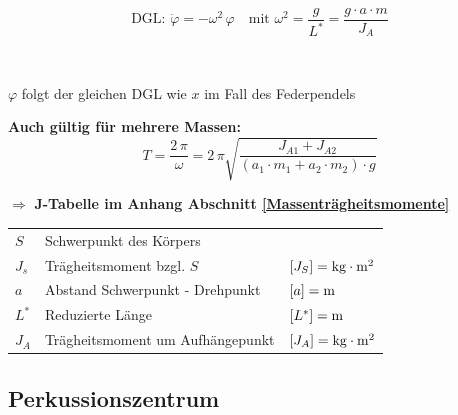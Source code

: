 \begin{minipage}{0.66\linewidth}

\\




$$ \boxed{ \text{DGL: } \ddot{\varphi} = -\omega^2 \, \varphi  \quad \text{mit } \omega^2 =  \frac{g}{L^*} = \frac{g \cdot a \cdot m}{J_A}  }$$

 \\

\vspace{0.2cm}

$\varphi$ folgt der gleichen DGL wie $x$ im Fall des Federpendels \\

\end{minipage}

\textbf{Auch gültig für mehrere Massen:}
$$ \boxed{  T = \frac{2 \, \pi}{\omega} = 2 \, \pi \sqrt{\frac{J_{A1} + J_{A2}}{(a_1 \cdot m_1 + a_2 \cdot m_2) \cdot g}} } $$

$\boldsymbol{ \Rightarrow} $ \textbf{J-Tabelle im Anhang Abschnitt \ref{Massenträgheitsmomente}} \\



\begin{tabular}{lll}
$S$ &  Schwerpunkt des Körpers &  \\
$J_s$ & Trägheitsmoment bzgl. $S$ & $[J_S] = \mathrm{kg} \cdot \mathrm{m}^2$ \\
$a$ & Abstand Schwerpunkt - Drehpunkt & $[a] = \mathrm{m}$ \\
$L^*$ & Reduzierte Länge & $[L^*] = \mathrm{m}$ \\
$J_A$ & Trägheitsmoment um Aufhängepunkt & $[J_A] = \mathrm{kg} \cdot \mathrm{m}^2$ 
\end{tabular}



\subsection{Perkussionszentrum}


